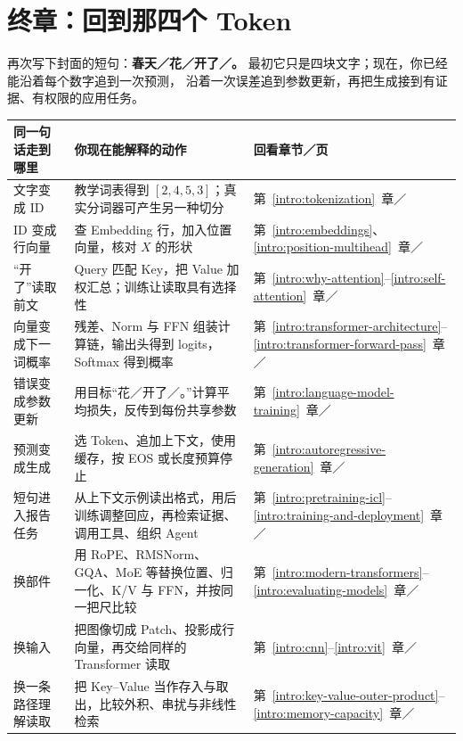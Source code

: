 \section*{终章：回到那四个 Token}
\label{sec:foundation-recap}

再次写下封面的短句：\textbf{春天／花／开了／。}
最初它只是四块文字；现在，你已经能沿着每个数字追到一次预测，
沿着一次误差追到参数更新，再把生成接到有证据、有权限的应用任务。

\begin{center}\small
\renewcommand{\arraystretch}{1.25}
\begin{tabularx}{\linewidth}{@{}>{\raggedright\arraybackslash}p{34mm}>{\raggedright\arraybackslash}X>{\raggedright\arraybackslash}p{31mm}@{}}
\toprule
同一句话走到哪里 & 你现在能解释的动作 & 回看章节／页\\\midrule
文字变成 ID & 教学词表得到 $[2,4,5,3]$；真实分词器可产生另一种切分 & 第~\ref*{intro:tokenization}~章／\pageref*{intro:tokenization}\\
ID 变成行向量 & 查 Embedding 行，加入位置向量，核对 $X$ 的形状 & 第~\ref*{intro:embeddings}、\ref*{intro:position-multihead}~章／\pageref*{intro:embeddings}\\
“开了”读取前文 & Query 匹配 Key，把 Value 加权汇总；训练让读取具有选择性 & 第~\ref*{intro:why-attention}--\ref*{intro:self-attention}~章／\pageref*{intro:why-attention}\\
向量变成下一词概率 & 残差、Norm 与 FFN 组装计算链，输出头得到 logits，Softmax 得到概率 & 第~\ref*{intro:transformer-architecture}--\ref*{intro:transformer-forward-pass}~章／\pageref*{intro:transformer-architecture}\\
错误变成参数更新 & 用目标“花／开了／。”计算平均损失，反传到每份共享参数 & 第~\ref*{intro:language-model-training}~章／\pageref*{intro:language-model-training}\\
预测变成生成 & 选 Token、追加上下文，使用缓存，按 EOS 或长度预算停止 & 第~\ref*{intro:autoregressive-generation}~章／\pageref*{intro:autoregressive-generation}\\
短句进入报告任务 & 从上下文示例读出格式，用后训练调整回应，再检索证据、调用工具、组织 Agent & 第~\ref*{intro:pretraining-icl}--\ref*{intro:training-and-deployment}~章／\pageref*{intro:pretraining-icl}\\
换部件 & 用 RoPE、RMSNorm、GQA、MoE 等替换位置、归一化、K/V 与 FFN，并按同一把尺比较 & 第~\ref*{intro:modern-transformers}--\ref*{intro:evaluating-models}~章／\pageref*{intro:modern-transformers}\\
换输入 & 把图像切成 Patch、投影成行向量，再交给同样的 Transformer 读取 & 第~\ref*{intro:cnn}--\ref*{intro:vit}~章／\pageref*{intro:cnn}\\
换一条路径理解读取 & 把 Key--Value 当作存入与取出，比较外积、串扰与非线性检索 & 第~\ref*{intro:key-value-outer-product}--\ref*{intro:memory-capacity}~章／\pageref*{intro:key-value-outer-product}\\
\bottomrule
\end{tabularx}
\end{center}

